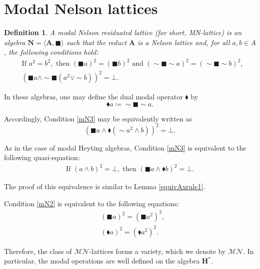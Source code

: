 \documentclass[pdflatex,sn-mathphys-num]{sn-jnl}%
\newcommand{\A}{\mathbf{A}}
\newcommand{\He}{\mathbf{H}}
\theoremstyle{thmstyleone}%
\theoremstyle{thmstyletwo}%
\theoremstyle{thmstylethree}%
\newtheorem{definition}{Definition}%
\begin{document}
\section{Modal Nelson lattices}\label{sec4}

\begin{definition}  \label{ModalN3Lattice} 
A \emph{modal Nelson residuated lattice} (for short, MN-lattice) is an algebra $\mathbf{N}= \langle \A,\blacksquare \rangle $ such that the reduct $ \A $ is a Nelson lattice and, for all $ a, b \in A $, the following conditions hold:
\begin{align}
    & \text{If } a^2 = b^2, \text{ then } (\blacksquare a)^2 = (\blacksquare b)^2 \text{ and } (\sim \blacksquare \sim a)^2 = (\sim \blacksquare \sim b)^2, \tag{mN1} \label{mN2} \\
    & (\blacksquare a \wedge \sim \blacksquare (a^2 \vee \sim b))^2 = \bot. \tag{mN2} \label{mN3}
\end{align}
\end{definition}
In these algebras, one may define the dual modal operator $\blacklozenge$ by
\begin{equation}\label{mN1}\tag{mN3}
\blacklozenge a \coloneqq \sim \blacksquare \sim a.
\end{equation}

Accordingly, Condition \eqref{mN3} may be equivalently written as
\[
  (\blacksquare a \wedge \blacklozenge (\sim a^2 \wedge b))^2 = \bot.  
\]

As in the case of modal Heyting algebras, Condition \eqref{mN3} is equivalent to the following quasi-equation: 
\begin{align}
    \text{If } (a \wedge b)^2 = \bot, \text{ then } (\blacksquare a \wedge \blacklozenge b)^2 = \bot. \tag{mN2'} \label{mN3'}
\end{align}

The proof of this equivalence is similar to Lemma \ref{equivAxrule1}.

Condition \eqref{mN2} is equivalent to the following equations:
\begin{align}
    & (\blacksquare a)^2 = (\blacksquare a^2)^2, \tag{mN1$\blacksquare$'}\label{mN2s}\\
    & (\blacklozenge a)^2 = (\blacklozenge a^2)^2. \tag{mN1$\blacklozenge$'}\label{mN2d}
\end{align}

Therefore, the class of $\mathcal{MN}$-lattices forms a variety, which we denote by $\mathcal{MN}$. In particular, the modal operations are well defined on the algebra $\He^*$.
\end{document}

